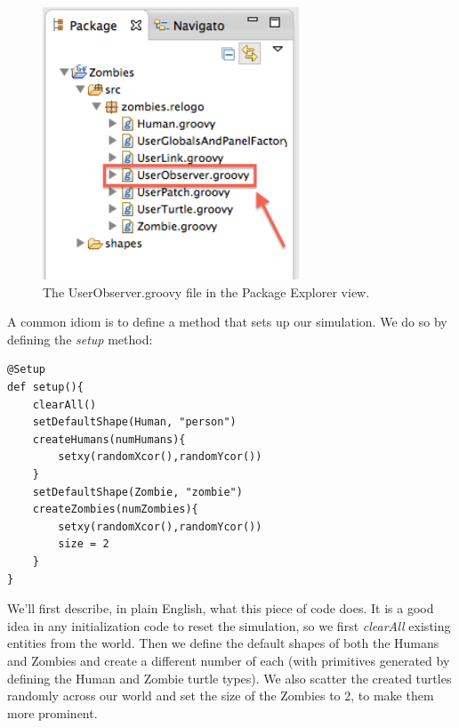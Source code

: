 \documentclass[11pt]{amsart}
\begin{document}
\begin{figure}
\begin{center}
\vspace{.2in}
\centerline {
\includegraphics[width=3in]{GettingStartedImages/UserObserver.png}
}
\caption{The UserObserver.groovy file in the Package Explorer view.}
\label{fig:UserObserver}
\end{center}
\end{figure}

A common idiom is to define a method that sets up our simulation. We do so by defining the \emph{setup} method:

\noindent\begin{minipage}[h]{\textwidth}
\vspace{.2in}
\lstset{language=java,caption=The UserObserver setup method.,label=lst:observersetup}
\begin{lstlisting}
@Setup
def setup(){
	clearAll()
	setDefaultShape(Human, "person")
	createHumans(numHumans){
		setxy(randomXcor(),randomYcor())
	}
	setDefaultShape(Zombie, "zombie")
	createZombies(numZombies){
		setxy(randomXcor(),randomYcor())
		size = 2
	}
}
\end{lstlisting}
\vspace{.2in}
\end{minipage}

We'll first describe, in plain English, what this piece of code does. It is a good idea in any initialization code to reset the simulation, so we first \emph{clearAll} existing entities from the world. Then we define the default shapes of both the Humans and Zombies and create a different number of each (with primitives generated by defining the Human and Zombie turtle types). We also scatter the created turtles randomly across our world and set the size of the Zombies to 2, to make them more prominent.
\end{document}
